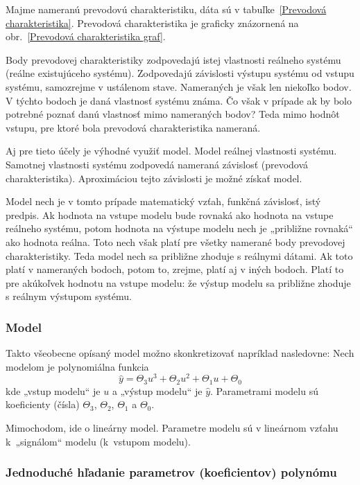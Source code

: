 \documentclass[a4paper, 10pt, ]{article}
\begin{document}
Majme nameranú prevodovú charakteristiku, dáta sú v tabuľke~\ref{Prevodová charakteristika}. Prevodová charakteristika je graficky znázornená na obr.~\ref{Prevodová charakteristika graf}.

Body prevodovej charakteristiky zodpovedajú istej vlastnosti reálneho systému (reálne existujúceho systému). Zodpovedajú závislosti výstupu systému od vstupu systému, samozrejme v ustálenom stave. Nameraných je však len niekoľko bodov. V týchto bodoch je daná vlastnosť systému známa. Čo však v prípade ak by bolo potrebné poznať danú vlastnosť mimo nameraných bodov? Teda mimo hodnôt vstupu, pre ktoré bola prevodová charakteristika nameraná.

Aj pre tieto účely je výhodné využiť model. Model reálnej vlastnosti systému. Samotnej vlastnosti systému zodpovedá nameraná závislosť (prevodová charakteristika). Aproximáciou tejto závislosti je možné získať model.

Model nech je v tomto prípade matematický vzťah, funkčná závislosť, istý predpis. Ak hodnota na vstupe modelu bude rovnaká ako hodnota na vstupe reálneho systému, potom hodnota na výstupe modelu nech je „približne rovnaká“ ako hodnota reálna. Toto nech však platí pre všetky namerané body prevodovej charakteristiky. Teda model nech sa približne zhoduje s reálnymi dátami. Ak toto platí v nameraných bodoch, potom to, zrejme, platí aj v iných bodoch. Platí to pre akúkoľvek hodnotu na vstupe modelu: že výstup modelu sa približne zhoduje s reálnym výstupom systému.


\subsubsection{Model}

Takto všeobecne opísaný model možno skonkretizovať napríklad nasledovne: Nech modelom je polynomiálna funkcia
\begin{equation} \label{polyFcnDef}
    \hat y = \Theta_3 u^3 + \Theta_2 u^2 + \Theta_1 u + \Theta_0
\end{equation}
kde „vstup modelu“ je $u$ a „výstup modelu“ je $\hat y$. Parametrami modelu sú koeficienty (čísla) $\Theta_3$, $\Theta_2$, $\Theta_1$ a $\Theta_0$.

Mimochodom, ide o lineárny model. Parametre modelu sú v lineárnom vzťahu k~„signálom“ modelu (k~vstupom modelu).


\subsubsection{Jednoduché hľadanie parametrov (koeficientov) polynómu}
\end{document}
